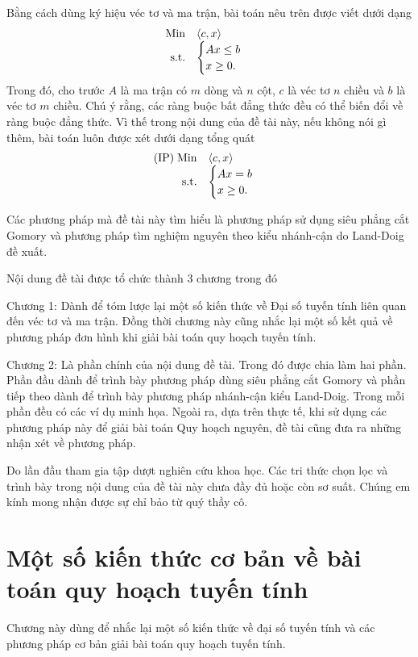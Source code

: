 \documentclass[12pt,a4paper]{report}
\begin{document}
Bằng cách dùng ký hiệu véc tơ và ma trận, bài toán nêu trên được viết dưới dạng 
$$
\begin{array}{rl}
{\rm Min}& \langle c,x \rangle \\
{\rm s.t.}& 
\begin{cases}Ax \le b\\
 x\ge 0.
 \end{cases}
\end{array}
$$
Trong đó, cho trước $A$ là ma trận có $m$ dòng và $n$ cột, $c$ là véc tơ $n$ chiều và $b$ là véc tơ $m$ chiều. Chú ý rằng, các ràng buộc bất đẳng thức đều có thể biến đổi về ràng buộc đẳng thức. Vì thế trong nội dung của đề tài này, nếu không nói gì thêm, bài toán luôn được xét dưới dạng tổng quát
$$
\begin{array}{rl}
{\rm (IP) \; Min}& \langle c,x \rangle \\
{\rm s.t.}& 
\begin{cases}Ax = b\\
 x\ge 0.
 \end{cases}
\end{array}
$$

Các phương pháp mà đề tài này tìm hiểu là phương pháp sử dụng siêu phẳng cắt Gomory và phương pháp tìm nghiệm nguyên theo kiểu nhánh-cận do Land-Doig đề xuất. 

Nội dung đề tài được tổ chức thành 3 chương trong đó 

Chương 1: Dành để tóm lược lại một số kiến thức về Đại số tuyến tính liên quan đến véc tơ và ma trận. Đồng thời chương này cũng nhắc lại một số kết quả về phương pháp đơn hình khi giải bài toán quy hoạch tuyến tính.

Chương 2: Là phần chính của nội dung đề tài. Trong đó được chia làm hai phần. Phần đầu dành để trình bày phương pháp dùng siêu phẳng cắt Gomory và phần tiếp theo dành để trình bày phương pháp nhánh-cận kiểu Land-Doig. Trong mỗi phần đều có các ví dụ minh họa. Ngoài ra, dựa trên thực tế, khi sử dụng các phương pháp này để giải bài toán Quy hoạch nguyên, đề tài cũng đưa ra những nhận xét về phương pháp.

Do lần đầu tham gia tập dượt nghiên cứu khoa học. Các tri thức chọn lọc và trình bày trong nội dung của đề tài này chưa đầy đủ hoặc còn sơ suất. Chúng em kính mong nhận được sự chỉ bảo từ quý thầy cô.

\newpage
\renewcommand{\baselinestretch}{1.2}
 
\chapter{Một số kiến thức cơ bản về bài toán quy hoạch tuyến tính}
Chương này dùng để nhắc lại một số kiến thức về đại số tuyến tính và các phương pháp cơ bản giải bài toán quy hoạch tuyến tính.
\end{document}
